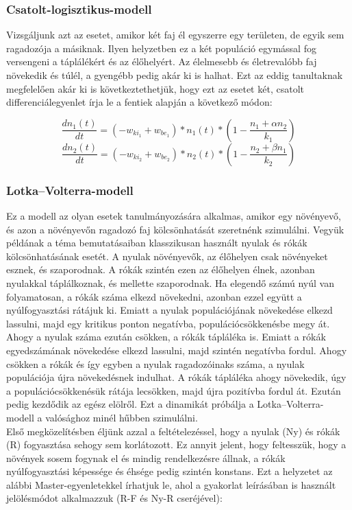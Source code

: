 \begin{multicols}{2}
\subsubsection{Csatolt-logisztikus-modell} \label{subsub:3.1.2}
Vizsgáljunk azt az esetet, amikor két faj él egyszerre egy területen, de egyik sem ragadozója a másiknak. Ilyen helyzetben ez a két populáció egymással fog versengeni a táplálékért és az élőhelyért. Az élelmesebb és életrevalóbb faj növekedik és túlél, a gyengébb pedig akár ki is halhat. Ezt az eddig tanultaknak megfelelően akár ki is következtethetjük, hogy ezt az esetet két, csatolt differenciálegyenlet írja le a fentiek alapján a következő módon:

\begin{equation} \label{eq:11}
    \frac{dn_1 \left( t \right)}{dt}
    =
    \left( -w_{ki_{1}} + w_{be_{1}} \right) * n_1 \left( t \right) * \left( 1 - \frac{n_1 + \alpha n_2}{k_1} \right)
\end{equation}
\begin{equation} \label{eq:12}
    \frac{dn_2 \left( t \right)}{dt}
    =
    \left( -w_{ki_{2}} + w_{be_{2}} \right) * n_2 \left( t \right) * \left( 1 - \frac{n_2 + \beta n_1}{k_2} \right)
\end{equation}

\subsubsection{Lotka--Volterra-modell} \label{subsub:3.1.3}
Ez a modell az olyan esetek tanulmányozására alkalmas, amikor egy növényevő, és azon a növényevőn ragadozó faj kölcsönhatását szeretnénk szimulálni. Vegyük példának a téma bemutatásaiban klasszikusan használt nyulak és rókák kölcsönhatásának esetét. A nyulak növényevők, az élőhelyen csak növényeket esznek, és szaporodnak. A rókák szintén ezen az élőhelyen élnek, azonban nyulakkal táplálkoznak, és mellette szaporodnak. Ha elegendő számú nyúl van folyamatosan, a rókák száma elkezd növekedni, azonban ezzel együtt a nyúlfogyasztási rátájuk ki. Emiatt a nyulak populációjának növekedése elkezd lassulni, majd egy kritikus ponton negatívba, populációcsökkenésbe megy át. Ahogy a nyulak száma ezután csökken, a rókák tápláléka is. Emiatt a rókák egyedszámának növekedése elkezd lassulni, majd szintén negatívba fordul. Ahogy csökken a rókák és így egyben a nyulak ragadozóinaks száma, a nyulak populációja újra növekedésnek indulhat. A rókák tápláléka ahogy növekedik, úgy a populációcsökkenésük rátája lecsökken, majd újra pozitívba fordul át. Ezután pedig kezdődik az egész elölről. Ezt a dinamikát próbálja a Lotka--Volterra-modell a valósághoz minél hűbben szimulálni. \\
Első megközelítésben éljünk azzal a feltételezéssel, hogy a nyulak (Ny) és rókák (R) fogyasztása sehogy sem korlátozott. Ez annyit jelent, hogy feltesszük, hogy a növények sosem fogynak el és mindig rendelkezésre állnak, a rókák nyúlfogyasztási képessége és éhsége pedig szintén konstans. Ezt a helyzetet az alábbi Master-egyenletekkel írhatjuk le, ahol a gyakorlat leírásában is használt jelölésmódot alkalmazzuk (R-F és Ny-R cseréjével):


\end{multicols}
